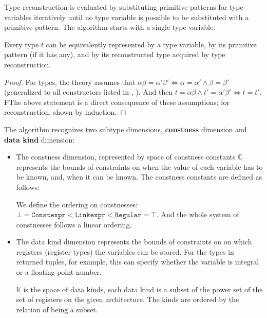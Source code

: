 \begin{defn}
    Type reconstruction is evaluated by substituting primitive patterns for type variables iteratively until no type variable is possible to be substituted with a primitive pattern. The algorithm starts with a single type variable.
\end{defn}

\begin{lemma}
    \label{typesObs}
    Every type $t$ can be equivalently represented by a type variable, by its primitive pattern (if it has any), and by its reconstructed type acquired by type reconstruction.
\end{lemma}

\begin{proof}
    For types, the theory assumes that  $\alpha \beta = \alpha' \beta' \Leftrightarrow \alpha = \alpha' \land \beta = \beta'$  (generalized to all constructors listed in , ). And then $t = \alpha \beta \land t' = \alpha' \beta' \Leftrightarrow t = t'$. FThe above statement is a direct consequence of these assumptions; for reconstruction, shown by induction.
\end{proof}

\begin{defn}
    The algorithm recognizes two subtype dimensions, \textbf{constness} dimension and \textbf{data kind} dimension:

    \begin{itemize}
        \item  The constness dimension, represented by space of constness constants $\mathbb{C}$ represents the bounds of constraints on when the value of each variable has to be known, and, when it can be known. The constness constants are defined as follows:

\begin{center}\begin{grammar}
\end{grammar}\end{center}

        We define the ordering on constnesses: $\bot = \mathtt{Constexpr} < \mathtt{Linkexpr} < \mathtt{Regular} = \top$. And the whole system of constnesses follows a linear ordering.

        \item The data kind dimension represents the bounds of constraints on on which registers (register types) the variables can be stored. For the types in returned tuples, for example, this can specify whether the variable is integral or a floating point number.

        $\mathbb{K}$ is the space of data kinds, each data kind is a subset of the power set of the set of registers on the given architecture. The kinds are ordered by the relation of being a subset.
    \end{itemize}
\end{defn}

